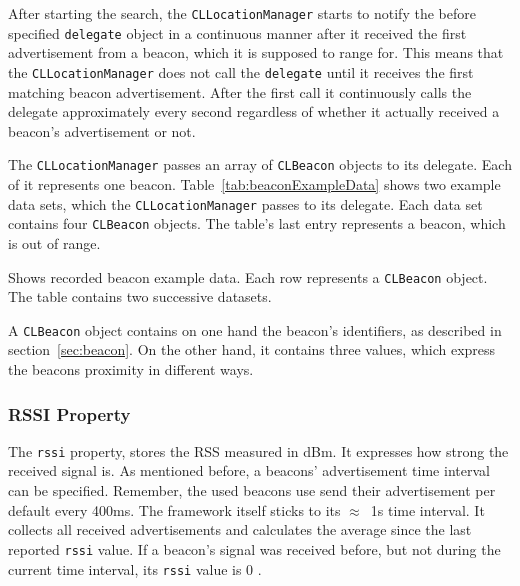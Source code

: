 After starting the search, the \texttt{CLLocationManager} starts to notify the before specified \texttt{delegate} object in a continuous manner after it received the first advertisement from a beacon, which it is supposed to range for. This means that the \texttt{CLLocationManager} does not call the \texttt{delegate} until it receives the first matching beacon advertisement. After the first call it continuously calls the delegate approximately every second regardless of whether it actually received a beacon's advertisement or not.

The \texttt{CLLocationManager} passes an array of \texttt{CLBeacon} objects to its delegate. Each of it represents one beacon. Table~\ref{tab:beaconExampleData} shows two example data sets, which the \texttt{CLLocationManager} passes to its delegate. Each data set contains four \texttt{CLBeacon} objects. The table's last entry represents a beacon, which is out of range.

\begin{table}
	
	\caption{Shows recorded beacon example data. Each row represents a \texttt{CLBeacon} object. The table contains two successive datasets.}
	\label{tab:beaconExampleData}
\end{table}

A \texttt{CLBeacon} object contains on one hand the beacon's identifiers, as described in section~\ref{sec:beacon}. On the other hand, it contains three values, which express the beacons proximity in different ways.

\subsubsection*{\acs{RSSI} Property}
The \texttt{rssi} property, stores the \acl{RSS} measured in dBm. It expresses how strong the received signal is. As mentioned before, a beacons' advertisement time interval can be specified. Remember, the used beacons use send their advertisement per default every 400ms. The framework itself sticks to its $\approx$~1s time interval. It collects all received advertisements and calculates the average since the last reported \texttt{rssi} value. If a beacon's signal was received before, but not during the current time interval, its \texttt{rssi} value is 0 \citep{apple:wwdc_2013_bruins,apple:ios_doc_cl}.

